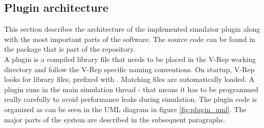


\subsection{Plugin architecture}
\label{sec:plugin_arch}

This section describes the architecture of the implemented simulator plugin along with the most important parts of the software. The source code can be found in the  package that is part of the  repository.\\

A plugin is a compiled library file that needs to be placed in the V-Rep working directory and follow the V-Rep specific naming conventions. On startup, V-Rep looks for library files, prefixed with . Matching files are automatically loaded. A plugin runs in the main simulation thread - that means it has to be programmed really carefully to avoid performance leaks during simulation. The plugin code is organized as can be seen in the UML diagram in figure \ref{fig:plugin_uml}. The major parts of the system are described in the subsequent paragraphs.

